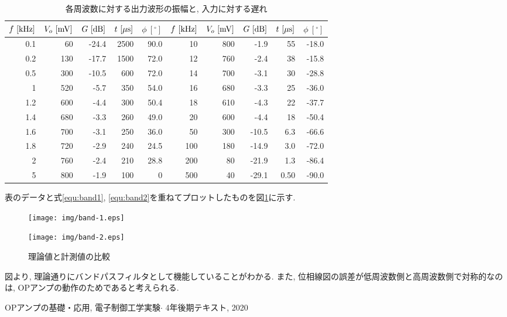 \documentclass[titlepage]{jsarticle}
\begin{document}
        \begin{table}[h]
            \caption{各周波数に対する出力波形の振幅と, 入力に対する遅れ}
            \label{tab:band}
            \centering
            \begin{tabular}{r|rr|rr||r|rr|rr}
                $f \ [\rm{kHz}]$ & $V_o \ [\rm{mV]}$ & $G \ [\rm{dB}]$ & $t \ [\mu\rm{s}]$ & $\phi \ [^\circ]$ & $f \ [\rm{kHz}]$ & $V_o \ [\rm{mV]}$ & $G \ [\rm{dB}]$ & $t \ [\mu\rm{s}]$ & $\phi \ [^\circ]$ \\ \hline \hline
                0.1 & 60 & -24.4 & 2500 & 90.0 & 10 & 800 & -1.9 & 55 & -18.0 \\
                0.2 & 130 & -17.7 & 1500 & 72.0 & 12 & 760 & -2.4 & 38 & -15.8 \\
                0.5 & 300 & -10.5 & 600 & 72.0 & 14 & 700 & -3.1 & 30 & -28.8 \\
                1 & 520 & -5.7 & 350 & 54.0 & 16 & 680 & -3.3 & 25 & -36.0 \\
                1.2 & 600 & -4.4 & 300 & 50.4 & 18 & 610 & -4.3 & 22 & -37.7 \\
                1.4 & 680 & -3.3 & 260 & 49.0 & 20 & 600 & -4.4 & 18 & -50.4 \\
                1.6 & 700 & -3.1 & 250 & 36.0 & 50 & 300 & -10.5 & 6.3 & -66.6 \\
                1.8 & 720 & -2.9 & 240 & 24.5 & 100 & 180 & -14.9 & 3.0 & -72.0 \\
                2 & 760 & -2.4 & 210 & 28.8 & 200 & 80 & -21.9 & 1.3 & -86.4 \\
                5 & 800 & -1.9 & 100 & 0 & 500 & 40 & -29.1 & 0.50 & -90.0 \\
            \end{tabular}
        \end{table}

        表のデータと式\ref{equ:band1}, \ref{equ:band2}を重ねてプロットしたものを図\ref{fig:bandex}に示す.

        \begin{figure}[h]
            \begin{minipage}{0.5\hsize}
                \centering
                \texttt{[image: img/band-1.eps]}
            \end{minipage}
            \begin{minipage}{0.5\hsize}
                \centering
                \texttt{[image: img/band-2.eps]}
            \end{minipage}
            \caption{理論値と計測値の比較}
            \label{fig:bandex}
        \end{figure}

        図より, 理論通りにバンドパスフィルタとして機能していることがわかる.
        また, 位相線図の誤差が低周波数側と高周波数側で対称的なのは,
        OPアンプの動作のためであると考えられる.
    
\begin{thebibliography}{99}
     OPアンプの基礎・応用, 電子制御工学実験$\cdot$ 4年後期テキスト, 2020
\end{thebibliography}
\end{document}
